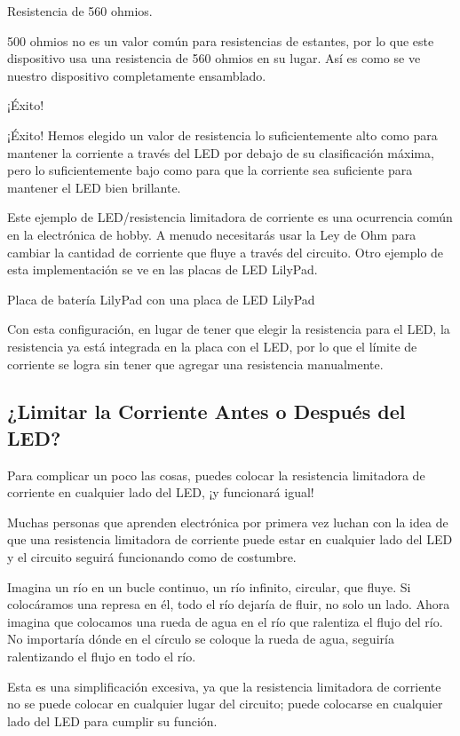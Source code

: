 \documentclass[output=paper, 
colorlinks,
citecolor=brown,
newtxmath
]{langscibook}
\begin{document}
Resistencia de 560 ohmios.

500 ohmios no es un valor común para resistencias de estantes, por lo que este dispositivo usa una resistencia de 560 ohmios en su lugar. Así es como se ve nuestro dispositivo completamente ensamblado.

¡Éxito!

¡Éxito! Hemos elegido un valor de resistencia lo suficientemente alto como para mantener la corriente a través del LED por debajo de su clasificación máxima, pero lo suficientemente bajo como para que la corriente sea suficiente para mantener el LED bien brillante.

Este ejemplo de LED/resistencia limitadora de corriente es una ocurrencia común en la electrónica de hobby. A menudo necesitarás usar la Ley de Ohm para cambiar la cantidad de corriente que fluye a través del circuito. Otro ejemplo de esta implementación se ve en las placas de LED LilyPad.

Placa de batería LilyPad con una placa de LED LilyPad

Con esta configuración, en lugar de tener que elegir la resistencia para el LED, la resistencia ya está integrada en la placa con el LED, por lo que el límite de corriente se logra sin tener que agregar una resistencia manualmente.

\subsection{¿Limitar la Corriente Antes o Después del LED?}

Para complicar un poco las cosas, puedes colocar la resistencia limitadora de corriente en cualquier lado del LED, ¡y funcionará igual!

Muchas personas que aprenden electrónica por primera vez luchan con la idea de que una resistencia limitadora de corriente puede estar en cualquier lado del LED y el circuito seguirá funcionando como de costumbre.

Imagina un río en un bucle continuo, un río infinito, circular, que fluye. Si colocáramos una represa en él, todo el río dejaría de fluir, no solo un lado. Ahora imagina que colocamos una rueda de agua en el río que ralentiza el flujo del río. No importaría dónde en el círculo se coloque la rueda de agua, seguiría ralentizando el flujo en todo el río.

Esta es una simplificación excesiva, ya que la resistencia limitadora de corriente no se puede colocar en cualquier lugar del circuito; puede colocarse en cualquier lado del LED para cumplir su función.
\end{document}

